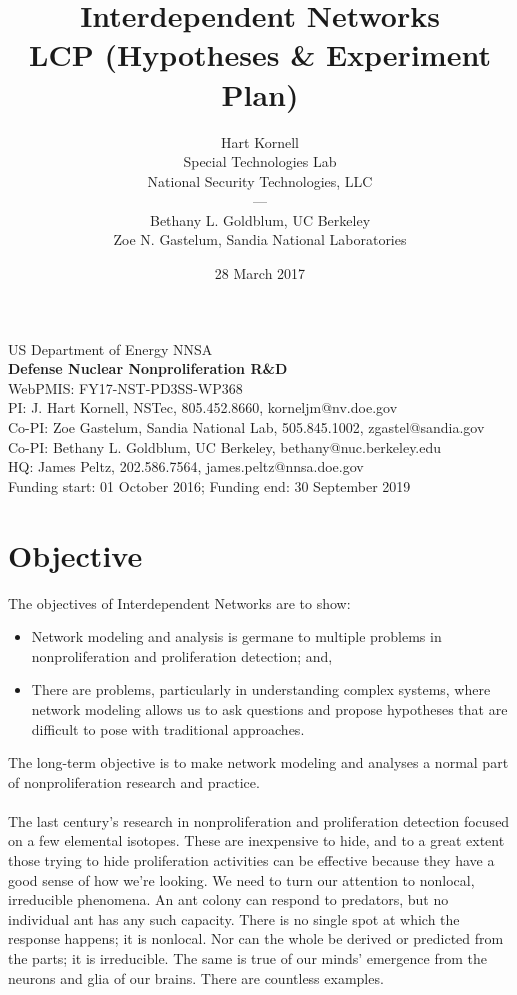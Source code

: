\documentclass{article} %
\title{Interdependent Networks\\LCP (Hypotheses \& Experiment Plan)}
\author{Hart Kornell\\ Special Technologies Lab\\National Security Technologies, LLC\\
---\\
Bethany L. Goldblum, UC Berkeley\\
Zoe N. Gastelum, Sandia National Laboratories}
\date{28 March 2017}
\begin{document}
\maketitle

\vfill
\begin{center}
US Department of Energy NNSA \\
\textbf{Defense Nuclear Nonproliferation R\&D} \\
WebPMIS: FY17-NST-PD3SS-WP368  \\
PI: J. Hart Kornell, NSTec, 805.452.8660, korneljm@nv.doe.gov \\
Co-PI: Zoe Gastelum, Sandia National Lab, 505.845.1002, zgastel@sandia.gov \\
Co-PI: Bethany L. Goldblum, UC Berkeley, bethany@nuc.berkeley.edu \\
HQ: James Peltz, 202.586.7564, james.peltz@nnsa.doe.gov \\
Funding start: 01 October 2016; Funding end: 30 September 2019
\end{center}
\newpage
\thispagestyle{empty}
\mbox{}
\newpage

\newpage

\onehalfspace

\tableofcontents{}

\newpage
\thispagestyle{empty}
\mbox{}
\newpage

\section{Objective}
The objectives of Interdependent Networks are to show:
\renewcommand\labelitemi{\tiny$\bullet$}
\begin{itemize}
\item Network modeling and analysis is germane to multiple problems in nonproliferation and proliferation detection; and,
\item There are problems, particularly in understanding complex systems, where network modeling allows us to ask questions and propose hypotheses that are difficult to pose with traditional approaches.
\end{itemize}
The long-term objective is to make network modeling and analyses a normal part of nonproliferation research and practice.\\
\\
\noindent The last century's research in nonproliferation and proliferation detection focused on a few elemental isotopes. These are inexpensive to hide, and to a great extent those trying to hide proliferation activities can be effective because they have a good sense of how we're looking. We need to turn our attention to nonlocal, irreducible phenomena. An ant colony can respond to predators, but no individual ant has any such capacity. There is no single spot at which the response happens; it is nonlocal. Nor can the whole be derived or predicted from the parts; it is irreducible. The same is true of our minds' emergence from the neurons and glia of our brains. There are countless examples.  
\end{document}
